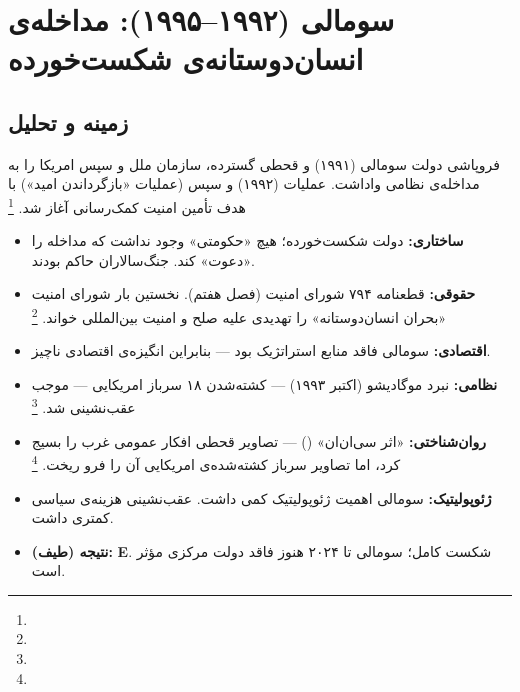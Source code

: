 \section{سومالی (۱۹۹۲–۱۹۹۵): مداخله‌ی انسان‌دوستانه‌ی شکست‌خورده}
\label{sec:ch10-somalia}

\subsection{زمینه و تحلیل}

فروپاشی دولت سومالی (۱۹۹۱) و قحطی گسترده، سازمان ملل و سپس امریکا را به مداخله‌ی نظامی واداشت. عملیات  (۱۹۹۲) و سپس  (عملیات «بازگرداندن امید») با هدف تأمین امنیت کمک‌رسانی آغاز شد.%
\footnote{}

\begin{tcolorbox}[casebox, title={تحلیل شش‌وجهی: سومالی (۱۹۹۲)}]
\begin{itemize}[nosep, rightmargin=1em]
  \item \textbf{ساختاری:} دولت شکست‌خورده؛ هیچ «حکومتی» وجود نداشت که مداخله را «دعوت» کند. جنگ‌سالاران حاکم بودند.
  \item \textbf{حقوقی:} قطعنامه ۷۹۴ شورای امنیت (فصل هفتم). نخستین بار شورای امنیت «بحران انسان‌دوستانه» را تهدیدی علیه صلح و امنیت بین‌المللی خواند.%
  \footnote{}
  \item \textbf{اقتصادی:} سومالی فاقد منابع استراتژیک بود — بنابراین انگیزه‌ی اقتصادی ناچیز.
  \item \textbf{نظامی:} نبرد موگادیشو (اکتبر ۱۹۹۳) — کشته‌شدن ۱۸ سرباز امریکایی — موجب عقب‌نشینی شد.%
  \footnote{}
  \item \textbf{روان‌شناختی:} «اثر سی‌ان‌ان» () — تصاویر قحطی افکار عمومی غرب را بسیج کرد، اما تصاویر سرباز کشته‌شده‌ی امریکایی آن را فرو ریخت.%
  \footnote{}
  \item \textbf{ژئوپولیتیک:} سومالی اهمیت ژئوپولیتیک کمی داشت. عقب‌نشینی هزینه‌ی سیاسی کمتری داشت.
  \item \textbf{نتیجه (طیف):} \textbf{E}. شکست کامل؛ سومالی تا ۲۰۲۴ هنوز فاقد دولت مرکزی مؤثر است.
\end{itemize}
\end{tcolorbox}

